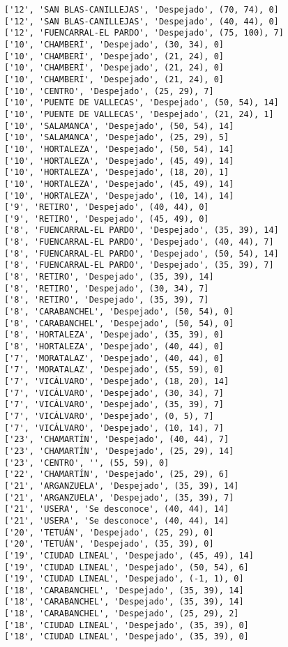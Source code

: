 \documentclass[11pt]{article}
\begin{document}
\begin{Verbatim}[commandchars=\\\{\}]
['12', 'SAN BLAS-CANILLEJAS', 'Despejado', (70, 74), 0]
['12', 'SAN BLAS-CANILLEJAS', 'Despejado', (40, 44), 0]
['12', 'FUENCARRAL-EL PARDO', 'Despejado', (75, 100), 7]
['10', 'CHAMBERÍ', 'Despejado', (30, 34), 0]
['10', 'CHAMBERÍ', 'Despejado', (21, 24), 0]
['10', 'CHAMBERÍ', 'Despejado', (21, 24), 0]
['10', 'CHAMBERÍ', 'Despejado', (21, 24), 0]
['10', 'CENTRO', 'Despejado', (25, 29), 7]
['10', 'PUENTE DE VALLECAS', 'Despejado', (50, 54), 14]
['10', 'PUENTE DE VALLECAS', 'Despejado', (21, 24), 1]
['10', 'SALAMANCA', 'Despejado', (50, 54), 14]
['10', 'SALAMANCA', 'Despejado', (25, 29), 5]
['10', 'HORTALEZA', 'Despejado', (50, 54), 14]
['10', 'HORTALEZA', 'Despejado', (45, 49), 14]
['10', 'HORTALEZA', 'Despejado', (18, 20), 1]
['10', 'HORTALEZA', 'Despejado', (45, 49), 14]
['10', 'HORTALEZA', 'Despejado', (10, 14), 14]
['9', 'RETIRO', 'Despejado', (40, 44), 0]
['9', 'RETIRO', 'Despejado', (45, 49), 0]
['8', 'FUENCARRAL-EL PARDO', 'Despejado', (35, 39), 14]
['8', 'FUENCARRAL-EL PARDO', 'Despejado', (40, 44), 7]
['8', 'FUENCARRAL-EL PARDO', 'Despejado', (50, 54), 14]
['8', 'FUENCARRAL-EL PARDO', 'Despejado', (35, 39), 7]
['8', 'RETIRO', 'Despejado', (35, 39), 14]
['8', 'RETIRO', 'Despejado', (30, 34), 7]
['8', 'RETIRO', 'Despejado', (35, 39), 7]
['8', 'CARABANCHEL', 'Despejado', (50, 54), 0]
['8', 'CARABANCHEL', 'Despejado', (50, 54), 0]
['8', 'HORTALEZA', 'Despejado', (35, 39), 0]
['8', 'HORTALEZA', 'Despejado', (40, 44), 0]
['7', 'MORATALAZ', 'Despejado', (40, 44), 0]
['7', 'MORATALAZ', 'Despejado', (55, 59), 0]
['7', 'VICÁLVARO', 'Despejado', (18, 20), 14]
['7', 'VICÁLVARO', 'Despejado', (30, 34), 7]
['7', 'VICÁLVARO', 'Despejado', (35, 39), 7]
['7', 'VICÁLVARO', 'Despejado', (0, 5), 7]
['7', 'VICÁLVARO', 'Despejado', (10, 14), 7]
['23', 'CHAMARTÍN', 'Despejado', (40, 44), 7]
['23', 'CHAMARTÍN', 'Despejado', (25, 29), 14]
['23', 'CENTRO', '', (55, 59), 0]
['22', 'CHAMARTÍN', 'Despejado', (25, 29), 6]
['21', 'ARGANZUELA', 'Despejado', (35, 39), 14]
['21', 'ARGANZUELA', 'Despejado', (35, 39), 7]
['21', 'USERA', 'Se desconoce', (40, 44), 14]
['21', 'USERA', 'Se desconoce', (40, 44), 14]
['20', 'TETUÁN', 'Despejado', (25, 29), 0]
['20', 'TETUÁN', 'Despejado', (35, 39), 0]
['19', 'CIUDAD LINEAL', 'Despejado', (45, 49), 14]
['19', 'CIUDAD LINEAL', 'Despejado', (50, 54), 6]
['19', 'CIUDAD LINEAL', 'Despejado', (-1, 1), 0]
['18', 'CARABANCHEL', 'Despejado', (35, 39), 14]
['18', 'CARABANCHEL', 'Despejado', (35, 39), 14]
['18', 'CARABANCHEL', 'Despejado', (25, 29), 2]
['18', 'CIUDAD LINEAL', 'Despejado', (35, 39), 0]
['18', 'CIUDAD LINEAL', 'Despejado', (35, 39), 0]

\end{Verbatim}
\end{document}
